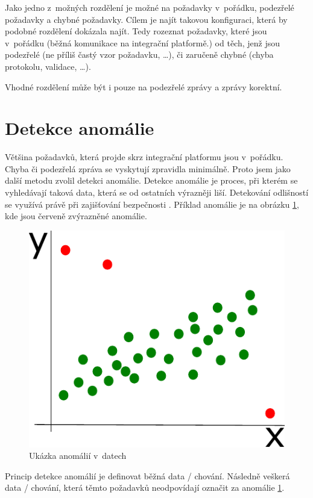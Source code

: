 \documentclass[thesis=M,czech]{FITthesis}[2012/10/20]
\newcommand{\tmpframe}[1]{\fbox{#1}}
\renewcommand{\tmpframe}[1]{#1}
\begin{document}
			Jako jedno z~možných rozdělení je možné na požadavky v~pořádku, podezřelé požadavky a chybné požadavky. Cílem je najít takovou konfiguraci, která by podobné rozdělení dokázala najít. Tedy rozeznat požadavky, které jsou v~pořádku (běžná komunikace na integrační platformě.) od těch, jenž jsou podezřelé (ne příliš častý vzor požadavku, \ldots), či zaručeně chybné (chyba protokolu, validace, \ldots). 
			
			Vhodné rozdělení může být i pouze na podezřelé zprávy a zprávy korektní.		
	
	\section{Detekce anomálie}
		Většina požadavků, která projde skrz integrační platformu jsou v~pořádku. Chyba či podezřelá zpráva se vyskytují zpravidla minimálně. Proto jsem jako další metodu zvolil detekci anomálie. Detekce anomálie je proces, při kterém se vyhledávají taková data, která se od ostatních výrazněji liší. Detekování odlišností se využívá právě při zajišťování bezpečnosti \cite{AnomDetectPCA}. Příklad anomálie je na obrázku \ref{fig:anomalyInData}, kde jsou červeně zvýrazněné anomálie.
		
		\begin{figure}[htb]\centering
			\tmpframe{\includegraphics[scale=0.8]{./img/outlier}}		
			\caption{Ukázka anomálií v~datech}
			\label{fig:anomalyInData}
		\end{figure}
	
		Princip detekce anomálií je definovat běžná data / chování. Následně veškerá data / chování, která těmto požadavků neodpovídají označit za anomálie \ref{fig:anomalyInData}. 
		
\end{document}
